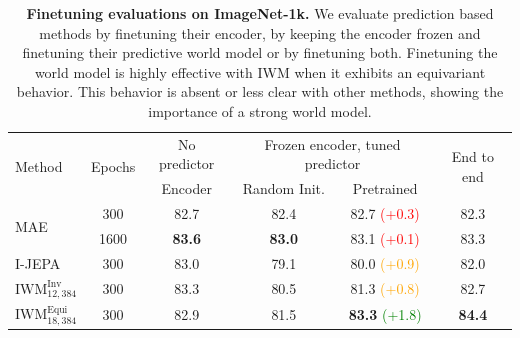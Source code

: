 \documentclass[twocolumn]{fairmeta}
\theoremstyle{plain}
\theoremstyle{definition}
\theoremstyle{remark}
\begin{document}
\begin{table}[!t]
\centering
    \caption{\fontsize{8.5pt}{8.5pt}\selectfont
    \textbf{How to predict for predictor finetuning}. Using the teacher improves performance, and the exact prediction task is not crucial. Null latents are more flexible and perform better. For better efficiency, a full prediction is not needed but leads to a small drop in performance. \textcolor{gray}{Gray} is our default setting.}
    \label{tab:pred-ft-ablation}
\vspace{-1em}
\end{table}



\begin{table}[!t]
\centering
    \caption{\fontsize{8.5pt}{8.5pt}\selectfont
    \textbf{Finetuning evaluations on ImageNet-1k.} We evaluate prediction based methods by finetuning their encoder, by keeping the encoder frozen and finetuning their predictive world model or by finetuning both. Finetuning the world model is highly effective with IWM when it exhibits an equivariant behavior. This behavior is absent or less clear with other methods, showing the importance of a strong world model. }
    \label{tab:full-results}
\begin{tabular}{lccccc}
\toprule
\multirow{2}{*}{Method} & \multirow{2}{*}{Epochs} & \multicolumn{1}{c}{No predictor} & \multicolumn{2}{c}{Frozen encoder, tuned predictor}  & \multirow{2}{*}{End to end}  \\
\cmidrule(l){3-3} \cmidrule(l){4-5}
& & Encoder & Random Init. & Pretrained &   \\
\midrule
\multirow{ 2}{*}{MAE} & 300  & 82.7 & 82.4 & 82.7 \textcolor{Red}{(+0.3)} & 82.3  \\
& 1600  & \textbf{83.6} & \textbf{83.0} & 83.1 \textcolor{Red}{(+0.1)} & 83.3  \\
I-JEPA & 300 & 83.0 & 79.1 & 80.0 \textcolor{orange}{(+0.9)} & 82.0   \\
\midrule
$\text{IWM}_{12,384}^\text{Inv}$ & 300  & 83.3 & 80.5 & 81.3 \textcolor{orange}{(+0.8)} & 82.7  \\
$\text{IWM}_{18,384}^\text{Equi}$ & 300 & 82.9 & 81.5 & \textbf{83.3} \textcolor{Green}{(+1.8)} &  \textbf{84.4} \\

\bottomrule
\end{tabular}
\vspace{-1em}

\end{table}
\end{document}
